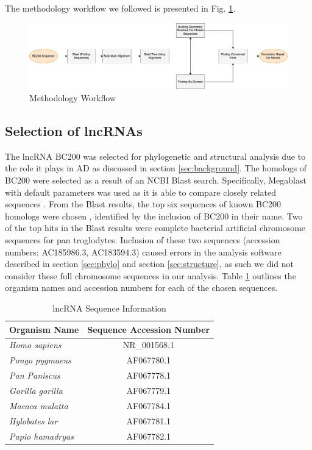 \documentclass[conference, 11pt]{IEEEtran}
\begin{document}
The methodology workflow we followed is presented in Fig. \ref{fig:methods}.

\begin{figure}[ht]
  \centering
  \includegraphics[width=\textwidth, keepaspectratio]{figs/workflow.png}
  \caption{Methodology Workflow}
  \label{fig:methods}
\end{figure}

\subsection{Selection of lncRNAs}\label{sec:lncRNA-selection}

The lncRNA BC200 was selected for phylogenetic and structural analysis due to the role it plays in AD as discussed in section \ref{sec:background}. 
The homologs of BC200 were selected as a result of an NCBI Blast \cite{blastTool} search. 
Specifically, Megablast \cite{morgulis2008database} with default parameters was used as it is able to compare closely related sequences \cite{amirmahani2018phylogenetic}. 
From the Blast results, the top six sequences of known BC200 homologs were chosen , identified by the inclusion of BC200 in their name. 
Two of the top hits in the Blast results were complete bacterial artificial chromosome sequences for pan troglodytes. 
Inclusion of these two sequences (accession numbers: AC185986.3, AC183594.3) caused errors in the analysis software described in section \ref{sec:phylo} and section \ref{sec:structure}, as such we did not consider these full chromosome sequences in our analysis. 
Table \ref{tbl:accession} outlines the organism names and accession numbers for each of the chosen sequences. 

\begin{table}[ht]
  \centering
  \caption{lncRNA Sequence Information}
  \label{tbl:accession}
  \begin{tabular}{lc}
    \toprule
    Organism Name & Sequence Accession Number \\
    \midrule
    \emph{Homo sapiens}    & NR\_001568.1 \\
    \emph{Pongo pygmaeus}  & AF067780.1 \\
    \emph{Pan Paniscus}    & AF067778.1 \\
    \emph{Gorilla gorilla} & AF067779.1 \\
    \emph{Macaca mulatta}  & AF067784.1 \\
    \emph{Hylobates lar}   & AF067781.1 \\
    \emph{Papio hamadryas} & AF067782.1 \\
    \bottomrule
  \end{tabular}
\end{table}
\end{document}
